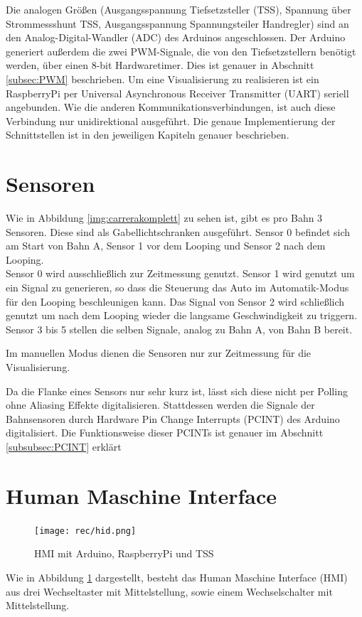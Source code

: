 \documentclass[a4paper, 11pt]{report}
\begin{document}
	Die analogen Größen (Ausgangsspannung Tiefsetzsteller (TSS), Spannung über Strommessshunt TSS, Ausgangsspannung Spannungsteiler Handregler) sind an den Analog-Digital-Wandler (ADC) des Arduinos angeschlossen.
	Der Arduino generiert außerdem die zwei PWM-Signale, die von den Tiefsetzstellern benötigt werden, über einen 8-bit Hardwaretimer.
	Dies ist genauer in Abschnitt \ref{subsec:PWM} beschrieben.
	Um eine Visualisierung zu realisieren ist ein RaspberryPi per Universal Asynchronous Receiver Transmitter (UART) seriell angebunden. Wie die anderen Kommunikationsverbindungen, ist auch diese Verbindung nur unidirektional ausgeführt.
	Die genaue Implementierung der Schnittstellen ist in den jeweiligen Kapiteln genauer beschrieben.
	\section{Sensoren}
		Wie in Abbildung \ref{img:carrerakomplett} zu sehen ist, gibt es pro Bahn 3 Sensoren. Diese sind als Gabellichtschranken ausgeführt. Sensor 0 befindet sich am Start von Bahn A, Sensor 1 vor dem Looping und Sensor 2 nach dem Looping.\\


		Sensor 0 wird ausschließlich zur Zeitmessung genutzt.
		Sensor 1 wird genutzt um ein Signal zu generieren, so dass die Steuerung das Auto im Automatik-Modus für den Looping beschleunigen kann.
		Das Signal von Sensor 2 wird schließlich genutzt um nach dem Looping wieder die langsame Geschwindigkeit zu triggern.\\
		Sensor 3 bis 5 stellen die selben Signale, analog zu Bahn A, von Bahn B bereit.

		Im manuellen Modus dienen die Sensoren nur zur Zeitmessung für die Visualisierung.

		Da die Flanke eines Sensors nur sehr kurz ist, lässt sich diese nicht per Polling ohne Aliasing Effekte digitalisieren. Stattdessen werden die Signale der Bahnsensoren durch Hardware Pin Change Interrupts (PCINT) des Arduino digitalisiert.
		Die Funktionsweise dieser PCINTs ist genauer im Abschnitt \ref{subsubsec:PCINT} erklärt
	\section{Human Maschine Interface}
		\begin{figure}[ht]
			\centering
			\texttt{[image: rec/hid.png]}
			\caption{HMI mit Arduino, RaspberryPi und TSS}

			\label{img:hid}
		\end{figure}
		Wie in Abbildung \ref{img:hid} dargestellt, besteht das Human Maschine Interface (HMI) aus drei Wechseltaster mit Mittelstellung, sowie einem Wechselschalter mit Mittelstellung.
\end{document}
